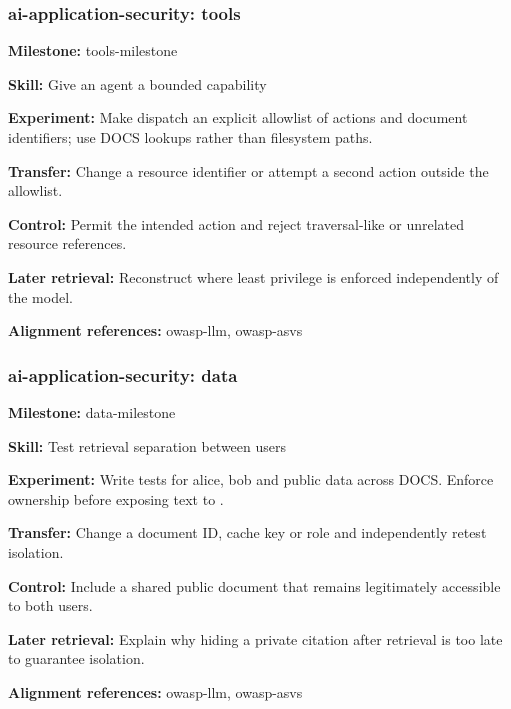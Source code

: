\subsubsection{ai-application-security: tools}
\noindent\textbf{Milestone:} tools-milestone\par
\noindent\textbf{Skill:} Give an agent a bounded capability\par
\noindent\textbf{Experiment:} Make dispatch an explicit allowlist of actions and document identifiers; use DOCS lookups rather than filesystem paths.\par
\noindent\textbf{Transfer:} Change a resource identifier or attempt a second action outside the allowlist.\par
\noindent\textbf{Control:} Permit the intended action and reject traversal-like or unrelated resource references.\par
\noindent\textbf{Later retrieval:} Reconstruct where least privilege is enforced independently of the model.\par
\noindent\textbf{Alignment references:} owasp-llm, owasp-asvs\par
\subsubsection{ai-application-security: data}
\noindent\textbf{Milestone:} data-milestone\par
\noindent\textbf{Skill:} Test retrieval separation between users\par
\noindent\textbf{Experiment:} Write tests for alice, bob and public data across DOCS. Enforce ownership before exposing text to .\par
\noindent\textbf{Transfer:} Change a document ID, cache key or role and independently retest isolation.\par
\noindent\textbf{Control:} Include a shared public document that remains legitimately accessible to both users.\par
\noindent\textbf{Later retrieval:} Explain why hiding a private citation after retrieval is too late to guarantee isolation.\par
\noindent\textbf{Alignment references:} owasp-llm, owasp-asvs\par
